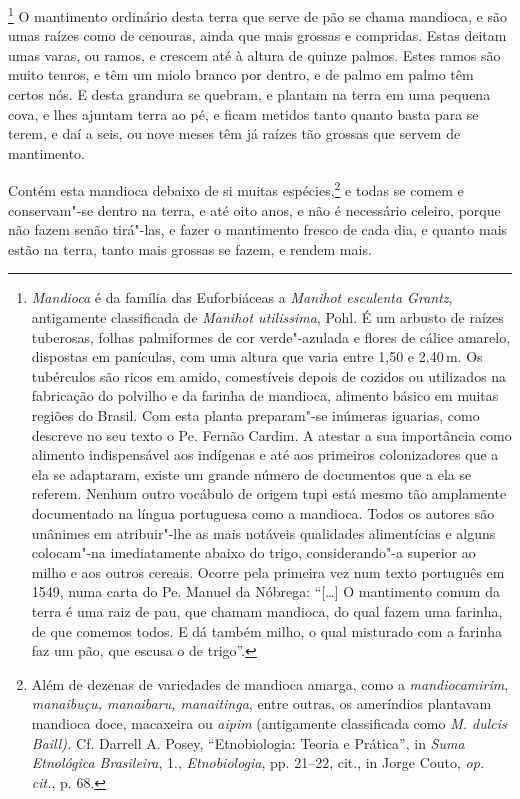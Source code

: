 \footnote{ \textit{Mandioca} é da família das
Euforbiáceas a \textit{Manihot esculenta Grantz}, antigamente
classificada de \textit{Manihot utilissima}, Pohl. É um arbusto de
raízes tuberosas, folhas palmiformes de cor verde"-azulada e flores de
cálice amarelo, dispostas em panículas, com uma altura que varia entre
1,50 e 2,40\,m. Os tubérculos são ricos em amido, comestíveis depois de
cozidos ou utilizados na fabricação do polvilho e da farinha de
mandioca, alimento básico em muitas regiões do Brasil. Com esta planta
preparam"-se inúmeras iguarias, como descreve no seu texto o Pe. Fernão
Cardim. A atestar a sua importância como alimento indispensável aos
indígenas e até aos primeiros colonizadores que a ela se adaptaram,
existe um grande número de documentos que a ela se referem. Nenhum 
outro vocábulo de origem tupi está mesmo tão amplamente documentado na
língua portuguesa como a mandioca. Todos os autores são unânimes em
atribuir"-lhe as mais notáveis qualidades alimentícias e alguns 
colocam"-na imediatamente abaixo do trigo, considerando"-a superior ao
milho e aos outros cereais. Ocorre pela primeira vez num texto
português em 1549, numa carta do Pe. Manuel da Nóbrega: ``[\ldots{}] 
O mantimento comum da terra é uma raiz de pau, que chamam
mandioca, do qual fazem uma farinha, de que comemos todos. E dá também
milho, o qual misturado com a farinha faz um pão, que escusa o de
trigo''.} O mantimento ordinário desta terra que serve de
pão se chama mandioca, e são umas raízes como de cenouras, ainda que
mais grossas e compridas. Estas deitam umas varas, ou ramos, e crescem
até à altura de quinze palmos. Estes ramos são muito tenros, e têm um
miolo branco por dentro, e de palmo em palmo têm certos nós. E desta
grandura se quebram, e plantam na terra em uma pequena cova, e lhes
ajuntam terra ao pé, e ficam metidos tanto quanto basta para se terem,
e daí a seis, ou nove meses têm já raízes tão grossas que servem de mantimento.

 Contém esta mandioca debaixo de si muitas espécies,\footnote{ Além de
dezenas de variedades de mandioca amarga, como a
\textit{mandiocamirim}, \textit{manaibuçu, manaibaru, manaitinga}, 
entre outras, os ameríndios plantavam mandioca doce, macaxeira ou
\textit{aipim} (antigamente classificada como \textit{M. dulcis Baill).} 
Cf. Darrell A. Posey, ``Etnobiologia: Teoria e Prática'', in
\textit{Suma Etnológica Brasileira}, 1., \textit{Etnobiologia}, 
pp. 21--22, cit., in Jorge Couto, \textit{op. cit.}, p. 68.} e todas se comem
e conservam"-se dentro na terra, e até oito anos, e não é necessário
celeiro, porque não fazem senão tirá"-las, e fazer o mantimento fresco
de cada dia, e quanto mais estão na terra, tanto mais grossas se fazem,
e rendem mais.

